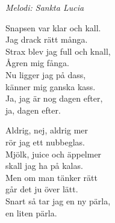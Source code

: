 {\footnotesize\textit{Melodi: Sankta Lucia}}\par
\vspace{10pt}
Snapsen var klar och kall.\\
Jag drack rätt många.\\
Strax blev jag full och knall,\\
Ågren mig fånga.\\
Nu ligger jag på dass,\\
känner mig ganska kass.\\
Ja, jag är nog dagen efter,\\
ja, dagen efter.\par
\vspace{6pt}
Aldrig, nej, aldrig mer\\
rör jag ett nubbeglas.\\
Mjölk, juice och äppelmer\\
skall jag ha på kalas.\\
Men om man tänker rätt\\
går det ju över lätt.\\
Snart så tar jag en ny pärla,\\
en liten pärla.

